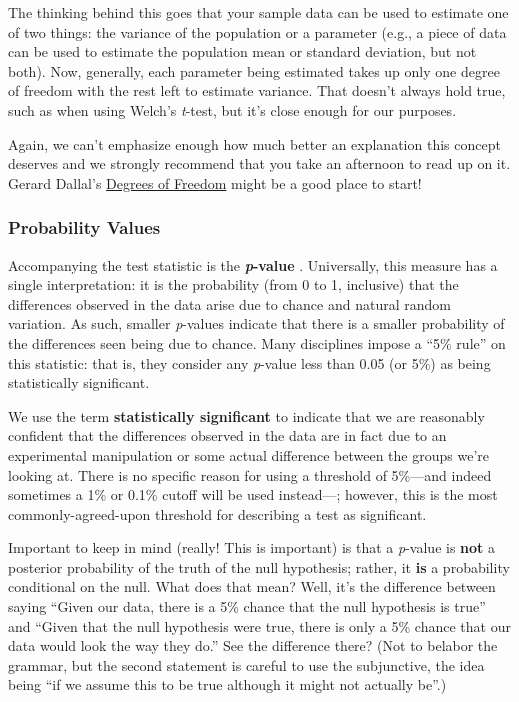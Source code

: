 The thinking behind this goes that your sample data can be used to estimate one of two things: the variance of the population or a parameter (e.g., a piece of data can be used to estimate the population mean or standard deviation, but not both). Now, generally, each parameter being estimated takes up only one degree of freedom with the rest left to estimate variance. That doesn't always hold true, such as when using Welch's \textit{t}-test, but it's close enough for our purposes.

Again, we can't emphasize enough how much better an explanation this concept deserves and we strongly recommend that you take an afternoon to read up on it. Gerard Dallal's \href{http://www.jerrydallal.com/LHSP/dof.htm}{Degrees of Freedom} might be a good place to start!

\subsubsection{Probability Values}
Accompanying the test statistic is the \textbf{\textit{p}-value} . Universally, this measure has a single interpretation: it is the probability (from 0 to 1, inclusive) that the differences observed in the data arise due to chance and natural random variation. As such, smaller \textit{p}-values indicate that there is a smaller probability of the differences seen being due to chance. Many disciplines impose a ``5\% rule'' on this statistic: that is, they consider any \textit{p}-value less than 0.05 (or 5\%) as being statistically significant.

We use the term \textbf{statistically significant} to indicate that we are reasonably confident that the differences observed in the data are in fact due to an experimental manipulation or some actual difference between the groups we're looking at. There is no specific reason for using a threshold of 5\%---and indeed sometimes a 1\% or 0.1\% cutoff will be used instead---; however, this is the most commonly-agreed-upon threshold for describing a test as significant.

Important to keep in mind (really! This is important) is that a \textit{p}-value is \textbf{not} a posterior probability of the truth of the null hypothesis; rather, it \textbf{is} a probability conditional on the null. What does that mean? Well, it's the difference between saying ``Given our data, there is a 5\% chance that the null hypothesis is true'' and ``Given that the null hypothesis were true, there is only a 5\% chance that our data would look the way they do.'' See the difference there? (Not to belabor the grammar, but the second statement is careful to use the subjunctive, the idea being ``if we assume this to be true although it might not actually be''.)


